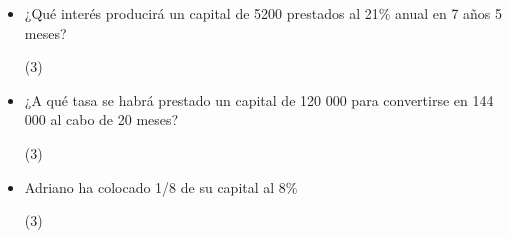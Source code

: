 \documentclass[10pt, twocolumn, landscape, a4paper]{article}
\begin{document}
\begin{itemize}
\item{¿Qué interés producirá un capital de 5200 \texteuro prestados al 21\% anual en 7 años 5 meses?
\begin{tasks}(3)
\end{tasks}
}
\item{¿A qué tasa se habrá prestado un capital de 120 000 para convertirse en 144 000 al cabo de 20 meses?
\begin{tasks}(3)
\end{tasks}
}
\item{Adriano ha colocado 1/8 de su capital al 8\%
\begin{tasks}(3)
\end{tasks}
}
\end{itemize}
\end{document}
